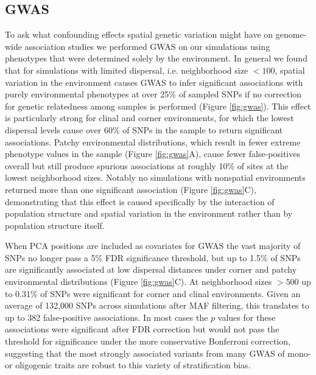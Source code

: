 \documentclass[10pt,twoside,lineno]{gsajnl}
\begin{document}
\subsection{GWAS}
To ask what confounding effects spatial genetic variation might have on genome-wide association studies we performed GWAS on our simulations using phenotypes that were determined solely by the environment. In general we found that for simulations with limited dispersal, i.e. neighborhood size $< 100$, spatial variation in the environment causes GWAS to infer significant associations with purely environmental phenotypes at over 25\% of sampled SNPs if no correction for genetic relatedness among samples is performed (Figure \ref{fig:gwas}). This effect is particularly strong for clinal and corner environments, for which the lowest dispersal levels cause over 60\% of SNPs in the sample to return significant associations. Patchy environmental distributions, which result in fewer extreme phenotype values in the sample (Figure \ref{fig:gwas}A), cause fewer false-positives overall but still produce spurious associations at roughly 10\% of sites at the lowest neighborhood sizes. Notably no simulations with nonspatial environments returned more than one significant association (Figure \ref{fig:gwas}C), demonstrating that this effect is caused specifically by the interaction of population structure and spatial variation in the environment rather than by population structure itself.  

When PCA positions are included as covariates for GWAS the vast majority of SNPs no longer pass a 5\% FDR significance threshold, but up to 1.5\% of SNPs are significantly associated at low dispersal distances under corner and patchy environmental distributions (Figure \ref{fig:gwas}C). At neighborhood sizes $> 500$ up to 0.31\% of SNPs were significant for corner and clinal environments. Given an average of 132,000 SNPs across simulations after MAF filtering, this translates to up to 382 false-positive associations. In most cases the $p$ values for these associations were significant after FDR correction but would not pass the threshold for significance under the more conservative Bonferroni correction, suggesting that the most strongly associated variants from many GWAS of mono- or oligogenic traits are robust to this variety of stratification bias. 
\end{document}
